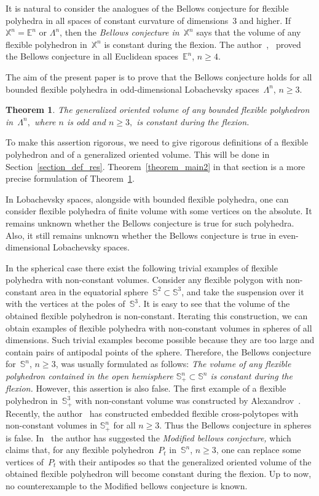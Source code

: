\documentclass[reqno,tbtags,12pt]{amsart}
\numberwithin{equation}{section}
\newcommand{\E}{\mathbb{E}}
\newcommand{\X}{\mathbb{X}}
\newcommand{\bS}{\mathbb{S}}
\newtheorem{theorem}{Theorem}[section]
\theoremstyle{definition}
\begin{document}
It is natural to consider the analogues of the Bellows conjecture for flexible polyhedra in all spaces of constant curvature of dimensions~$3$ and higher. If $\X^n=\E^n$ or $\Lambda^n$, then the \textit{Bellows conjecture in~$\X^n$} says that the volume of any flexible polyhedron in~$\X^n$ is constant during the flexion. The author~\cite{Gai11},~\cite{Gai12} proved the Bellows conjecture in all Euclidean spaces~$\E^n$, $n\ge 4$. 

The aim of the present paper is to prove that the Bellows conjecture holds for  all bounded flexible polyhedra in odd-dimensional Lobachevsky spaces~$\Lambda^{n}$, $n\ge 3$. 

\begin{theorem}\label{theorem_main}
The generalized oriented volume of any bounded flexible polyhedron in~$\Lambda^n,$ where $n$ is odd and $n\ge 3,$ is constant during the flexion.
\end{theorem}

To make this assertion rigorous, we need to give rigorous definitions of a flexible polyhedron and of a generalized oriented volume. This will be done in Section~\ref{section_def_res}. Theorem~\ref{theorem_main2} in that section is a more precise formulation of Theorem~\ref{theorem_main}.

In Lobachevsky spaces, alongside with bounded flexible polyhedra, one can consider flexible polyhedra of finite volume with some vertices on the absolute. It remains unknown whether the Bellows conjecture is true for such polyhedra. Also, it still remains unknown whether the Bellows conjecture is true in even-dimensional Lobachevsky spaces.

In the spherical case there exist the following trivial examples of flexible polyhedra with non-constant volumes. Consider any flexible polygon with non-constant area in the equatorial sphere~$\bS^2\subset\bS^3$, and take the suspension over it with the vertices at the poles of~$\bS^3$. It is easy to see that the volume of the obtained flexible polyhedron is non-constant. Iterating this construction, we can obtain examples of flexible polyhedra with non-constant volumes in spheres of all dimensions.  Such trivial examples become possible because they are too large and contain pairs of antipodal points of the sphere. Therefore, the Bellows conjecture for~$\bS^n$, $n\ge 3$, was usually formulated as follows: \textit{The volume of any flexible polyhedron contained in the open hemisphere $\bS^n_+\subset\bS^n$ is constant during the flexion.} However, this assertion is also false. The first example of a flexible polyhedron in~$\bS^3_+$ with non-constant volume was constructed by Alexandrov~\cite{Ale97}. Recently,  the author~\cite{Gai15} has constructed embedded flexible cross-polytopes with non-constant volumes in $\bS^n_+$ for all $n\ge 3$. Thus the Bellows conjecture in spheres is false. In~\cite{Gai15} the author has suggested the \textit{Modified bellows conjecture,} which claims that, for any flexible polyhedron~$P_t$ in~$\bS^n$, $n\ge 3$, one can replace some vertices of~$P_t$ with their antipodes so that the generalized oriented volume of the obtained flexible polyhedron will become constant during the flexion. Up to now, no counterexample to the Modified bellows conjecture is known.
\end{document}
